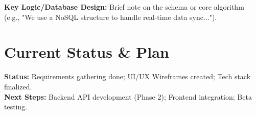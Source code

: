 \documentclass[11pt, a4paper]{article}
\begin{document}
\textbf{Key Logic/Database Design:} Brief note on the schema or core algorithm (e.g., "We use a NoSQL structure to handle real-time data sync...").

\section{Current Status \& Plan}
\textbf{Status:} Requirements gathering done; UI/UX Wireframes created; Tech stack finalized. \\
\textbf{Next Steps:} Backend API development (Phase 2); Frontend integration; Beta testing.

\vspace{0.2cm}
\renewcommand{\refname}{\normalsize References}

\end{document}
